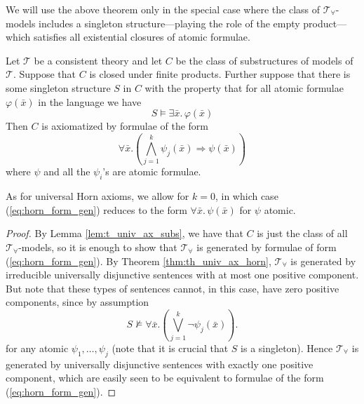 We will use the above theorem only in the special case where the class of $\mathcal{T}_{\forall}$-models includes a singleton structure---playing the role of the empty product---which satisfies all existential closures of atomic formulae. 
\begin{coro}\label{coro:ax_horn_ax_gen}
	Let $\mathcal{T}$ be a consistent theory and let $C$ be the class of substructures of models of $\mathcal{T}$.  Suppose that $C$ is closed under finite products. Further suppose that there is some singleton structure $S$ in $C$ with the property that for all atomic formulae $\varphi(\bar{x})$ in the language we have
	\[
	S \models \exists \bar{x}. \,\varphi(\bar{x})
	\]
	Then $C$ is axiomatized by formulae of the form
	\begin{equation}\label{eq:horn_form_gen}
		\forall\bar{x}. \left(\bigwedge_{j=1}^k\psi_j(\bar{x}) \Rightarrow \psi(\bar{x})\right) 
	\end{equation}
	where $\psi$ and all the $\psi_i$'s are atomic formulae.
\end{coro}
\begin{rem}
	As for universal Horn axioms, we allow for $k=0$, in which case (\ref{eq:horn_form_gen}) reduces to the form $\forall \bar{x}. \,\psi(\bar{x})$ for $\psi$ atomic.
\end{rem}
\begin{proof}
	By Lemma \ref{lem:t_univ_ax_subs}, we have that $C$ is just the class of all $\mathcal{T}_{\forall}$-models, so it is enough to show that $\mathcal{T}_{\forall}$ is generated by formulae of form (\ref{eq:horn_form_gen}). By Theorem \ref{thm:th_univ_ax_horn}, $\mathcal{T}_{\forall}$ is generated by irreducible universally disjunctive sentences with at most one positive component. But note that these types of sentences cannot, in this case, have zero positive components, since by assumption 
	\[
	S \nvDash \forall \bar{x}. \left(\bigvee_{j=1}^k \neg\psi_j(\bar{x})\right).
	\]
	for any atomic $\psi_1,\ldots,\psi_j$ (note that it is crucial that $S$ is a singleton). Hence $\mathcal{T}_{\forall}$ is generated by universally disjunctive sentences with exactly one positive component, which are easily seen to be equivalent to formulae of the form (\ref{eq:horn_form_gen}).
\end{proof}

